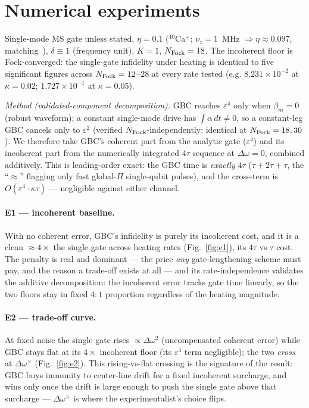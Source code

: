\documentclass[aps,prapplied,twocolumn,superscriptaddress,floatfix,nofootinbib]{revtex4-2}
\begin{document}
\section{Numerical experiments}
Single-mode MS gate unless stated, $\eta=0.1$ (${}^{40}$Ca$^+$; $\nu_z=1$~MHz
$\Rightarrow\eta\approx0.097$, matching~\cite{Zhang25}), $\delta\equiv1$ (frequency unit),
$K=1$, $N_{\rm Fock}=18$. The incoherent floor is Fock-converged: the single-gate infidelity
under heating is identical to five significant figures across $N_{\rm Fock}=12$--$28$ at every
rate tested (e.g. $8.231\times10^{-2}$ at $\kappa=0.02$; $1.727\times10^{-1}$ at $\kappa=0.05$).

\textit{Method (validated-component decomposition).} GBC reaches $\varepsilon^4$ only when
$\beta_m=0$ (robust waveform); a constant single-mode drive has $\int\alpha\,dt\neq0$, so a
constant-leg GBC cancels only to $\varepsilon^2$ (verified $N_{\rm Fock}$-independently: identical
at $N_{\rm Fock}=18,30$). We therefore take GBC's coherent part from the analytic gate
($\varepsilon^4$) and its incoherent part from the numerically integrated $4\tau$ sequence at
$\Delta\omega=0$, combined additively. This is leading-order exact: the GBC time is
\emph{exactly} $4\tau$ ($\tau{+}2\tau{+}\tau$, the ``$\approx$'' flagging only fast global-$\Pi$
single-qubit pulses), and the cross-term is $O(\varepsilon^4\!\cdot\!\kappa\tau)$ --- negligible
against either channel.

\paragraph{E1 --- incoherent baseline.} With no coherent error, GBC's infidelity is purely its
incoherent cost, and it is a clean $\approx4\times$ the single gate across heating rates
(Fig.~\ref{fig:e1}), its $4\tau$ vs $\tau$ cost. The penalty is real and dominant --- the price
\emph{any} gate-lengthening scheme must pay, and the reason a trade-off exists at all --- and its
rate-independence validates the additive decomposition: the incoherent error tracks gate time
linearly, so the two floors stay in fixed $4{:}1$ proportion regardless of the heating magnitude.

\paragraph{E2 --- trade-off curve.} At fixed noise the single gate rises $\propto\Delta\omega^2$
(uncompensated coherent error) while GBC stays flat at its $4\times$ incoherent floor (its
$\varepsilon^4$ term negligible); the two \emph{cross} at $\Delta\omega^\times$
(Fig.~\ref{fig:e2}). This rising-vs-flat crossing is the signature of the result: GBC buys
immunity to center-line drift for a fixed incoherent surcharge, and wins only once the drift is
large enough to push the single gate above that surcharge --- $\Delta\omega^\times$ is where the
experimentalist's choice flips.
\end{document}
